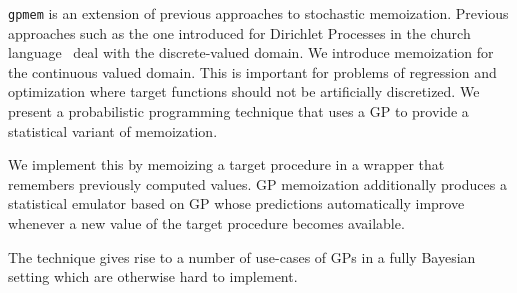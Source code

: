 {\tt gpmem} is an extension of previous approaches to stochastic memoization. Previous approaches such as the one introduced for Dirichlet Processes in the church language~\citep{goodman2008church} deal with the discrete-valued domain. We introduce memoization for the continuous valued domain. This is important for problems of regression and optimization where target functions should not be artificially discretized. We present a probabilistic programming technique that uses a GP to provide a statistical variant of memoization. 

We implement this by memoizing a target procedure in a wrapper that remembers previously computed values. GP memoization additionally produces a statistical emulator based on GP whose predictions automatically improve whenever a new value of the target procedure becomes available.



The technique gives rise to a number of use-cases of GPs in a fully Bayesian setting which are otherwise hard to implement.